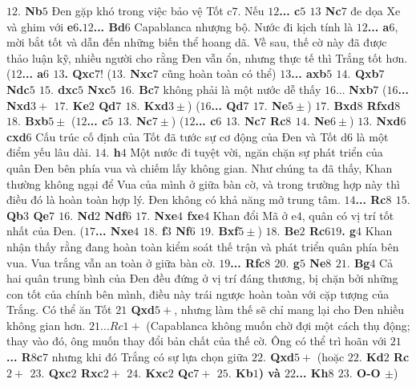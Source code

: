 \begin{multicols}{2}
	\vskip 0.1cm
	\textbf{\color{gocco}$12.$ Nb$5$} Đen gặp khó trong việc bảo vệ Tốt c$7$. Nếu \textbf{\color{gocco}$12$... c$5$ $13$ Nc$7$} đe dọa Xe và ghim với \textbf{\color{gocco}e$6$.$12$... Bd$6$} Capablanca nhượng bộ. Nước đi kịch tính là \textbf{\color{gocco}$12$... a$6$}, mời bắt tốt và dẫn đến những biến thể hoang dã. Về sau, thế cờ này đã được thảo luận kỹ, nhiều người cho rằng Đen vẫn ổn, nhưng thực tế thì Trắng tốt hơn. 
	\vskip 0.1cm
	(\textbf{\color{gocco}$12$... a$6$ $13$. Qxc$7$}! (\textbf{\color{gocco}$13.$ Nxc$7$} cũng hoàn toàn có thể) \textbf{\color{gocco}$13$... axb$5$ $14.$ Qxb$7$ Ndc$5$ $15.$ dxc$5$ Nxc$5$ $16.$ Bc$7$} không phải là một nước dễ thấy $16$... \textbf{\color{gocco}Nxb$7$} (\textbf{\color{gocco}$16$... Nxd$3+$ $17.$ Ke$2$ Qd$7$ $18.$ Kxd$3\pm$}) (\textbf{\color{gocco}$16$... Qd$7$ $17.$ Ne$5\pm$}) \textbf{\color{gocco}$17.$ Bxd$8$ Rfxd$8$ $18.$ Bxb$5\pm$}
	\vskip 0.1cm
	(\textbf{\color{gocco}$12$... c$5$ $13.$ Nc$7\pm$}) 
	\vskip 0.1cm
	(\textbf{\color{gocco}$12$... c$6$ $13.$ Nc$7$ Rc$8$ $14.$ Ne$6 \pm$})
	\vskip 0.1cm
	\textbf{\color{gocco}$13.$ Nxd$6$ cxd$6$}  Cấu trúc cố định của Tốt đã tước sự cơ động của Đen và Tốt d6 là một điểm yếu lâu dài.
	\vskip 0.1cm
	\textbf{\color{gocco}$14.$ h$4$} Một nước đi tuyệt vời, ngăn chặn sự phát triển của quân Đen bên phía vua và chiếm lấy không gian. Như chúng ta đã thấy, Khan thường không ngại để Vua của mình ở giữa bàn cờ, và trong trường hợp này thì điều đó là hoàn toàn hợp lý. Đen không có khả năng mở trung tâm. \textbf{\color{gocco}$14$... Rc$8$ $15.$ Qb$3$ Qe$7$ $16.$ Nd$2$ Ndf$6$ $17.$ Nxe$4$ fxe$4$} Khan đổi Mã ở e$4$, quân có vị trí tốt nhất của Đen. 
	\vskip 0.1cm
	(\textbf{\color{gocco}$17$... Nxe$4$ $18.$ f$3$ Nf$6$ $19.$ Bxf$5\pm$})
	\vskip 0.1cm
	\textbf{\color{gocco}$18.$ Be$2$ Rc$619$. g$4$} Khan nhận thấy rằng đang hoàn toàn kiểm soát thế trận và phát triển quân phía bên vua. Vua trắng vẫn an toàn ở giữa bàn cờ. \textbf{\color{gocco}$19$... Rfc$8$ $20.$ g$5$ Ne$8$ $21.$ Bg$4$}
	\vskip 0.1cm 
	Cả hai quân trung bình của Đen đều đứng ở vị trí đáng thương, bị chặn bởi những con tốt của chính bên mình, điều này trái ngược hoàn toàn với cặp tượng của Trắng. Có thể ăn Tốt \textbf{\color{gocco}$21$ Qxd$5+$}, nhưng làm thế sẽ chỉ mang lại cho Đen nhiều không gian hơn. \textbf{\color{gocco}$21... Rc1+$} 
	\vskip 0.1cm
	(Capablanca không muốn chờ đợi một cách thụ động; thay vào đó, ông muốn thay đổi bản chất của thế cờ. Ông có thể trì hoãn với  \textbf{\color{gocco}$21$... R$8$c$7$} nhưng khi đó Trắng có sự lựa chọn giữa  \textbf{\color{gocco}$22.$ Qxd$5+$}  (hoặc \textbf{\color{gocco}$22.$ Kd$2$ Rc$2+$ $23.$ Qxc$2$ Rxc$2+$ $24.$ Kxc$2$ Qc$7+$ $25.$ Kb$1$) và $22$... Kh$8$ $23.$ O-O $\pm$})

\end{multicols}

